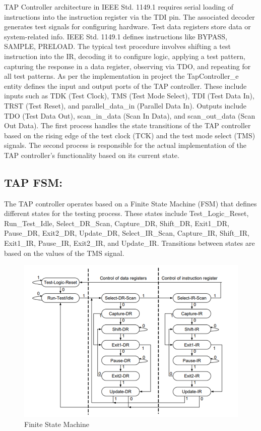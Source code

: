 TAP Controller architecture in IEEE Std. 1149.1 requires serial loading of instructions into the instruction register via the TDI pin. The associated decoder generates test signals for configuring hardware. Test data registers store data or system-related info. IEEE Std. 1149.1 defines instructions like BYPASS, SAMPLE, PRELOAD. The typical test procedure involves shifting a test instruction into the IR, decoding it to configure logic, applying a test pattern, capturing the response in a data register, observing via TDO, and repeating for all test patterns.
As per the implementation in project the TapController\_e entity defines the input and output ports of the TAP controller. These include inputs such as TDK (Test Clock), TMS (Test Mode Select), TDI (Test Data In), TRST (Test Reset), and parallel\_data\_in (Parallel Data In). Outputs include TDO (Test Data Out), scan\_in\_data (Scan In Data), and scan\_out\_data (Scan Out Data).
The first process handles the state transitions of the TAP controller based on the rising edge of the test clock (TCK) and the test mode select (TMS) signals. The second process is responsible for the actual implementation of the TAP controller's functionality based on its current state.
\vspace{5mm}

\subsection{TAP FSM:}
The TAP controller operates based on a Finite State Machine (FSM) that defines different states for the testing process. These states include Test\_Logic\_Reset, Run\_Test\_Idle, Select\_DR\_Scan, Capture\_DR, Shift\_DR, Exit1\_DR, Pause\_DR, Exit2\_DR, Update\_DR, Select\_IR\_Scan, Capture\_IR, Shift\_IR, Exit1\_IR, Pause\_IR, Exit2\_IR, and Update\_IR. Transitions between states are based on the values of the TMS signal.
\vspace{3mm}

\begin{figure}[h]
    \centering
    \includegraphics[width=0.9\linewidth]{Image/FSM.png}
    \caption{Finite State Machine}
    \label{fig:enter-label}
\end{figure}

